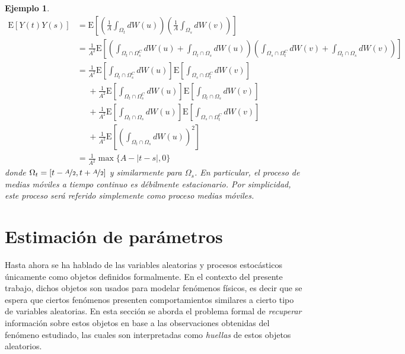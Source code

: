 \documentclass[12pt,letterpaper]{book}
\newtheorem{ejemplo}{Ejemplo}[chapter]
\newcommand{\E}[1]{\mathrm{E}\left[ #1 \right]}
\newcommand{\abso}[1]{\left| #1 \right|}
\newcommand{\pheq}{\phantom{=}}
\begin{document}
\begin{ejemplo}
\begin{align*}
\E{Y(t)Y(s)} &= 
\E{ \left( \frac{1}{A}\int_{\Omega_t} dW(u) \right) \left( \frac{1}{A}\int_{\Omega_s} dW(v)\right) } \\
&= 
\frac{1}{A^2} 
\E{ 
\left( 
\int_{\Omega_t \cap \Omega_s^C} dW(u) + \int_{\Omega_t \cap \Omega_s} dW(u) 
\right)
\left( 
\int_{\Omega_s \cap \Omega_t^C} dW(v) + \int_{\Omega_t \cap \Omega_s} dW(v) 
\right)  
} \\
&=
\frac{1}{A^2} 
\E{  
\int_{\Omega_t \cap \Omega_s^C} dW(u)  
}
\E{
\int_{\Omega_s \cap \Omega_t^C} dW(v) 
} \\
&\pheq
+ \frac{1}{A^2} 
\E{ 
\int_{\Omega_t \cap \Omega_s^C} dW(u)  
}
\E{
 \int_{\Omega_t \cap \Omega_s} dW(v) 
} \\
&\pheq
+\frac{1}{A^2} 
\E{ 
\int_{\Omega_t \cap \Omega_s} dW(u) 
}
\E{
\int_{\Omega_s \cap \Omega_t^C} dW(v)
} \\
&\pheq
+\frac{1}{A^2} 
\E{ 
\left( 
\int_{\Omega_t \cap \Omega_s} dW(u) 
\right)^2
} \\
&= \frac{1}{A^2} \max \{ A-\abso{t-s}, 0 \}
\end{align*}
donde $\Omega_t = \left[ t - \nicefrac{A}{2}, t + \nicefrac{A}{2} \right]$ y similarmente para $\Omega_s$.
%
En particular, el proceso de medias móviles a tiempo continuo es débilmente estacionario.
%
Por simplicidad, este proceso será referido simplemente como \textit{proceso medias móviles}.
\end{ejemplo}


\section{Estimación de parámetros}

Hasta ahora se ha hablado de las variables aleatorias y procesos estocásticos únicamente como objetos definidos formalmente.
%
En el contexto del presente trabajo, dichos objetos son usados para modelar fenómenos físicos, es decir que se espera que ciertos fenómenos presenten comportamientos similares a cierto tipo de variables aleatorias.
%
%
En esta sección se aborda el problema formal de \textit{recuperar} información sobre estos objetos en base a las observaciones obtenidas del fenómeno estudiado, las cuales son interpretadas como \textit{huellas} de estos objetos aleatorios.
\end{document}
